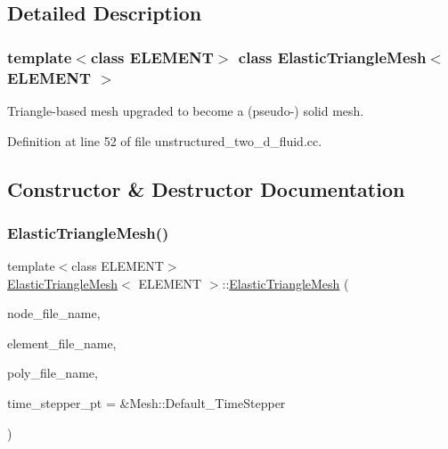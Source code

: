 \subsection{Detailed Description}
\subsubsection*{template$<$class E\+L\+E\+M\+E\+NT$>$\newline
class Elastic\+Triangle\+Mesh$<$ E\+L\+E\+M\+E\+N\+T $>$}

Triangle-\/based mesh upgraded to become a (pseudo-\/) solid mesh. 

Definition at line 52 of file unstructured\+\_\+two\+\_\+d\+\_\+fluid.\+cc.



\subsection{Constructor \& Destructor Documentation}
\mbox{\label{classElasticTriangleMesh_a4c24e9abbde344d34e1e08fb3319d7b6}} 
\subsubsection{\texorpdfstring{Elastic\+Triangle\+Mesh()}{ElasticTriangleMesh()}}
{\footnotesize\ttfamily template$<$class E\+L\+E\+M\+E\+NT$>$ \\
\hyperlink{classElasticTriangleMesh}{Elastic\+Triangle\+Mesh}$<$ E\+L\+E\+M\+E\+NT $>$\+::\hyperlink{classElasticTriangleMesh}{Elastic\+Triangle\+Mesh} (\begin{DoxyParamCaption}\item[{const std\+::string \&}]{node\+\_\+file\+\_\+name,  }\item[{const std\+::string \&}]{element\+\_\+file\+\_\+name,  }\item[{const std\+::string \&}]{poly\+\_\+file\+\_\+name,  }\item[{Time\+Stepper $\ast$}]{time\+\_\+stepper\+\_\+pt = {\ttfamily \&Mesh\+:\+:Default\+\_\+TimeStepper} }\end{DoxyParamCaption})\hspace{0.3cm}{\ttfamily [inline]}}



